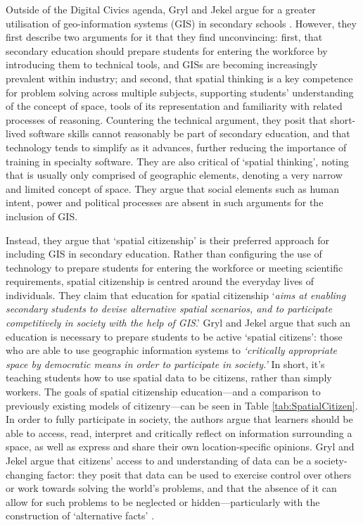 Outside of the Digital Civics agenda, Gryl and Jekel argue for a greater utilisation of geo-information systems (GIS) in secondary schools \citep{Gryl2012}. However, they first describe two arguments for it that they find unconvincing: first, that secondary education should prepare students for entering the workforce by introducing them to technical tools, and GISs are becoming increasingly prevalent within industry; and second, that spatial thinking is a key competence for problem solving across multiple subjects, supporting students' understanding of the concept of space, tools of its representation and familiarity with related processes of reasoning. Countering the technical argument, they posit that short-lived software skills cannot reasonably be part of secondary education, and that technology tends to simplify as it advances, further reducing the importance of training in specialty software. They are also critical of `spatial thinking', noting that is usually only comprised of geographic elements, denoting a very narrow and limited concept of space. They argue that social elements such as human intent, power and political processes are absent in such arguments for the inclusion of GIS.

Instead, they argue that `spatial citizenship' is their preferred approach for including GIS in secondary education. Rather than configuring the use of technology to prepare students for entering the workforce or meeting scientific requirements, spatial citizenship is centred around the everyday lives of individuals. They claim that education for spatial citizenship `\textit{aims at enabling secondary students to devise alternative spatial scenarios, and to participate competitively in society with the help of GIS}.' Gryl and Jekel argue that such an education is necessary to prepare students to be active `spatial citizens': those who are able to use geographic information systems to \textit{`critically appropriate space by democratic means in order to participate in society.’} In short, it's teaching students how to use spatial data to be citizens, rather than simply workers. The goals of spatial citizenship education---and a comparison to previously existing models of citizenry---can be seen in Table \ref{tab:SpatialCitizen}. In order to fully participate in society, the authors argue that learners should be able to access, read, interpret and critically reflect on information surrounding a space, as well as express and share their own location-specific opinions. Gryl and Jekel argue that citizens' access to and understanding of data can be a society-changing factor: they posit that data can be used to exercise control over others or work towards solving the world's problems, and that the absence of it can allow for such problems to be neglected or hidden---particularly with the construction of `alternative facts' \citep{gryl2018}. 

